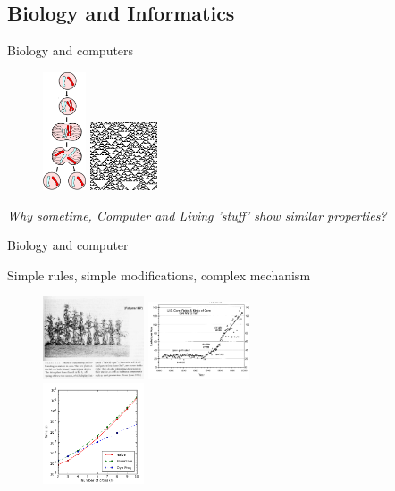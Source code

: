 \documentclass[8pt, handout=show,notes=show]{beamer}
\begin{document}
\subsection{Biology and Informatics}
\begin{frame} {Biology and computers}

    \begin{figure}
	\includegraphics[height=3.5cm]{images/mitosis.png}\hspace{.8cm}
	\includegraphics[width=2cm]{images/Rule22rand.png} 
    \end{figure}

    \vfill

    \begin{center}
	\emph{Why sometime, Computer and Living 'stuff' show similar properties? }
    \end{center}

\end{frame}

\begin{frame}{Biology and computer}

    Simple rules, simple modifications, complex mechanism\\
    \begin{figure}
	\includegraphics[width=3cm]{images/hybrid.png}\hspace{.3cm}
	\includegraphics[width=3cm]{images/maize.png} \\
	\includegraphics[width=3cm]{images/tsp.png}
    \end{figure}
    
\end{frame}
\end{document}
